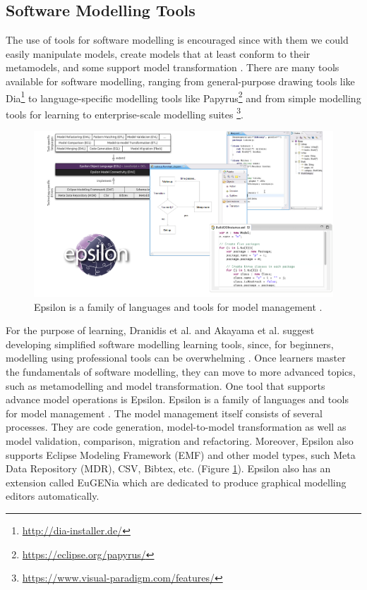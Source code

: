 \documentclass[12pt, a4paper]{report}
\begin{document}
{\subsection{Software Modelling Tools}
The use of tools for software modelling is encouraged since with them we could easily manipulate models, create models that at least conform to their metamodels, and some support model transformation \cite{brambilla2012model}. There are many tools available for software modelling, ranging from general-purpose drawing tools like Dia\footnote{\url{http://dia-installer.de/}} to language-specific modelling tools like Papyrus\footnote{\url{https://eclipse.org/papyrus/}} and from  simple modelling tools for learning \cite{dranidis2015learning} to enterprise-scale modelling suites \footnote{\url{https://www.visual-paradigm.com/features/}}. 

\begin{figure}[!ht]
\centering
\includegraphics[width=\textwidth]{epsilon}
\caption{Epsilon is a family of languages and tools for model management \cite{kolovos2010epsilon}.}
\label{epsilon}
\end{figure}

For the purpose of learning, Dranidis et al. and Akayama et al. suggest developing simplified software modelling learning tools, since, for beginners, modelling using professional tools can be overwhelming \cite{dranidis2015learning, Akayama2013}. Once learners master the fundamentals of software modelling, they can move to more advanced topics, such as metamodelling and model transformation. One tool that supports advance model operations is Epsilon. Epsilon is a family of languages and tools for model management \cite{kolovos2010epsilon}. The model management itself consists of several processes. They are code generation, model-to-model transformation as well as model validation, comparison, migration and refactoring. Moreover, Epsilon also supports Eclipse Modeling Framework (EMF) and other model types, such Meta Data Repository (MDR), CSV, Bibtex, etc. (Figure \ref{epsilon}). Epsilon also has an extension called EuGENia which are dedicated to produce graphical modelling editors automatically\cite{kolovos2015eugenia}.

}
\end{document}
